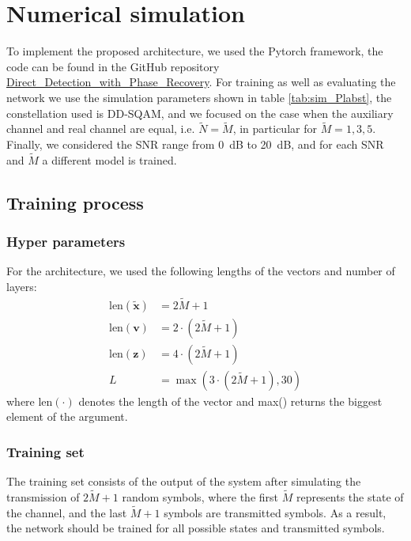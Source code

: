 \section{Numerical simulation}

To implement the proposed architecture, we used the Pytorch framework, the code can be found in the GitHub repository \href{https://github.com/dfigueroa11/Direct_Detection_with_Phase_Recovery.git}{Direct\_Detection\_with\_Phase\_Recovery}. For training as well as evaluating the network we use the simulation parameters shown in table \ref{tab:sim_Plabst}, the constellation used is DD-SQAM, and we focused on the case when the auxiliary channel and real channel are equal, i.e. $\widetilde{N}=\widetilde{M}$, in particular for $\widetilde{M}=1,3,5$. Finally, we considered the SNR range from \SI{0}{dB} to \SI{20}{dB}, and for each SNR and $\widetilde{M}$ a different model is trained.

\subsection{Training process}

\subsubsection{Hyper parameters}

For the architecture, we used the following lengths of the vectors and number of layers:
\begin{align}
	\text{len}(\tilde{\bm x})&=2\widetilde{M}+1\\
	\text{len}(\bm v)&=2\cdot(2\widetilde{M}+1)\\
	\text{len}(\bm z)&=4\cdot(2\widetilde{M}+1)\\
	L&=\max(3\cdot(2\widetilde{M}+1),30)
\end{align}
where len$(\cdot)$ denotes the length of the vector and max() returns the biggest element of the argument.

\subsubsection{Training set}

The training set consists of the output of the system after simulating the transmission of $2\widetilde{M}+1$ random symbols, where the first $\widetilde{M}$ represents the state of the channel, and the last $\widetilde{M}+1$ symbols are transmitted symbols. As a result, the network should be trained for all possible states and transmitted symbols.

